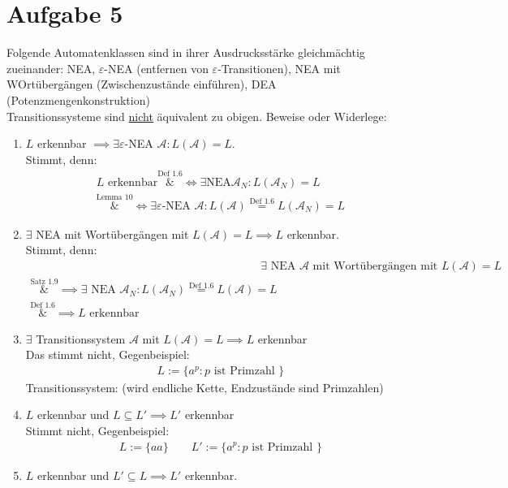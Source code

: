\documentclass[12pt,a4paper]{article}
\newcommand{\A}{\mathcal{A}}
\begin{document}
\section*{Aufgabe 5}
Folgende Automatenklassen sind in ihrer Ausdrucksstärke gleichmächtig zueinander:
NEA, $\varepsilon$-NEA (entfernen von $\varepsilon$-Transitionen), NEA mit WOrtübergängen (Zwischenzustände einführen), DEA (Potenzmengenkonstruktion)\\
Transitionssysteme sind \underline{nicht} äquivalent zu obigen.\nl
Beweise oder Widerlege:
\begin{enumerate}[label=\alph*)]
	\item $L$ erkennbar $\implies\exists\varepsilon$-NEA $\A:L(\A)=L$.\\
	Stimmt, denn:
	\begin{align*}
		L\text{ erkennbar}
		\overset{\text{Def 1.6}}&\Longleftrightarrow
		\exists\text{NEA}\A_N:L(\A_N)=L\\
		\overset{\text{Lemma 10}}&\Longleftrightarrow
		\exists\varepsilon\text{-NEA }\A:L(\A)\overset{\text{Def 1.6}}{=}L(\A_N)=L
	\end{align*}
	\item $\exists$ NEA mit Wortübergängen mit $L(\A)=L\implies L$ erkennbar.\\
	Stimmt, denn:
	\begin{align*}
		&\exists\text{ NEA $\A$ mit Wortübergängen mit }L(\A)=L\\
		\overset{\text{Satz 1.9}}&\implies
		\exists\text{ NEA }\A_N:L(\A_N)\overset{\text{Def 1.6}}=L(\A)=L\\
		\overset{\text{Def 1.6}}&\implies
		L\text{ erkennbar}
	\end{align*}
	\item $\exists$ Transitionssystem $\A$ mit $L(\A)=L\implies L$ erkennbar\\
	Das stimmt nicht, Gegenbeispiel:
	\begin{align*}
		L:=\Big\lbrace a^p:p\text{ ist Primzahl }\Big\rbrace
	\end{align*}
	Transitionssystem: (wird endliche Kette, Endzustände sind Primzahlen)
	\item $L$ erkennbar und $L\subseteq L'\implies L'$ erkennbar\\
	Stimmt nicht, Gegenbeispiel:
	\begin{align*}
		L:=\lbrace aa\rbrace\qquad
		L':=\Big\lbrace a^p:p\text{ ist Primzahl }\Big\rbrace
	\end{align*}
	\item $L$ erkennbar und $L'\subseteq L\implies L'$ erkennbar.\\

\end{enumerate}
\end{document}
